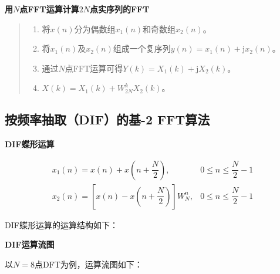 \documentclass[cn, hazy, blue, normal, 12pt]{elegantnote}
\begin{document}
\textbf{用$N$点FFT运算计算$2N$点实序列的FFT}

\begin{quote}
\begin{enumerate}
    \item 将$x(n)$分为偶数组$x_1(n)$和奇数组$x_2(n)$。
    \item 将$x_1(n)$及$x_2(n)$组成一个复序列$y(n)=x_1(n)+\text{j}x_2(n)$。
    \item 通过$N$点FFT运算可得$Y(k)=X_1(k)+\text{j}X_2(k)$。
    \item $X(k)=X_1(k)+W_{2N}^{k}X_2(k)$。
\end{enumerate}
\end{quote}

\subsection{按频率抽取（DIF）的基-2 FFT算法}

\textbf{DIF蝶形运算}

\begin{equation}
\begin{array}{ll}
    x_1(n)=x(n)+x\left(n+\dfrac{N}{2}\right), & 0\leq n\leq \dfrac{N}{2}-1 \\
    x_2(n)=\left[x(n)-x\left(n+\dfrac{N}{2}\right)\right]W_N^n, & 0\leq n\leq \dfrac{N}{2}-1
\end{array}
\end{equation}

DIF蝶形运算的运算结构如下：

\begin{center}
\end{center}

\textbf{DIF运算流图}

以$N=8$点DFT为例，运算流图如下：
\end{document}
